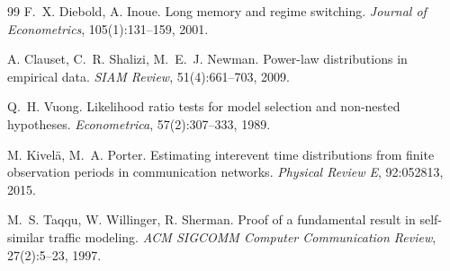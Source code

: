 \documentclass[11pt,a4paper]{article}
\theoremstyle{definition}
\begin{document}
\begin{thebibliography}{99}
 F.~X. Diebold, A. Inoue. Long memory and regime switching.
\textit{Journal of Econometrics}, 105(1):131--159, 2001.

 A. Clauset, C.~R. Shalizi, M.~E.~J. Newman. Power-law
distributions in empirical data. \textit{SIAM Review}, 51(4):661--703, 2009.

 Q.~H. Vuong. Likelihood ratio tests for model selection and
non-nested hypotheses. \textit{Econometrica}, 57(2):307--333, 1989.

 M. Kivelä, M.~A. Porter. Estimating interevent time
distributions from finite observation periods in communication networks.
\textit{Physical Review E}, 92:052813, 2015.

 M.~S. Taqqu, W. Willinger, R. Sherman. Proof of a fundamental
result in self-similar traffic modeling. \textit{ACM SIGCOMM Computer
Communication Review}, 27(2):5--23, 1997.

\end{thebibliography}
\end{document}
